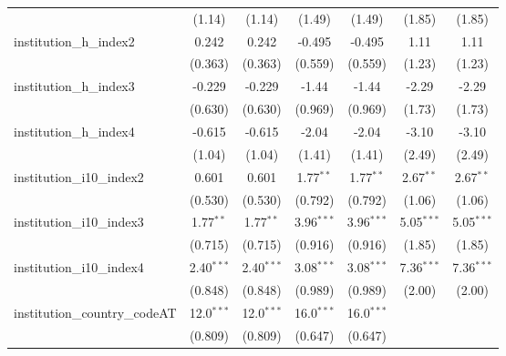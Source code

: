 \begin{tabular}{lcccccc}
                                         & (1.14)        & (1.14)        & (1.49)        & (1.49)        & (1.85)        & (1.85)\\   
   institution\_h\_index2                & 0.242         & 0.242         & -0.495        & -0.495        & 1.11          & 1.11\\   
                                         & (0.363)       & (0.363)       & (0.559)       & (0.559)       & (1.23)        & (1.23)\\   
   institution\_h\_index3                & -0.229        & -0.229        & -1.44         & -1.44         & -2.29         & -2.29\\   
                                         & (0.630)       & (0.630)       & (0.969)       & (0.969)       & (1.73)        & (1.73)\\   
   institution\_h\_index4                & -0.615        & -0.615        & -2.04         & -2.04         & -3.10         & -3.10\\   
                                         & (1.04)        & (1.04)        & (1.41)        & (1.41)        & (2.49)        & (2.49)\\   
   institution\_i10\_index2              & 0.601         & 0.601         & 1.77$^{**}$   & 1.77$^{**}$   & 2.67$^{**}$   & 2.67$^{**}$\\   
                                         & (0.530)       & (0.530)       & (0.792)       & (0.792)       & (1.06)        & (1.06)\\   
   institution\_i10\_index3              & 1.77$^{**}$   & 1.77$^{**}$   & 3.96$^{***}$  & 3.96$^{***}$  & 5.05$^{***}$  & 5.05$^{***}$\\   
                                         & (0.715)       & (0.715)       & (0.916)       & (0.916)       & (1.85)        & (1.85)\\   
   institution\_i10\_index4              & 2.40$^{***}$  & 2.40$^{***}$  & 3.08$^{***}$  & 3.08$^{***}$  & 7.36$^{***}$  & 7.36$^{***}$\\   
                                         & (0.848)       & (0.848)       & (0.989)       & (0.989)       & (2.00)        & (2.00)\\   
   institution\_country\_codeAT          & 12.0$^{***}$  & 12.0$^{***}$  & 16.0$^{***}$  & 16.0$^{***}$  &               &   \\   
                                         & (0.809)       & (0.809)       & (0.647)       & (0.647)       &               &   \\   

\end{tabular}
